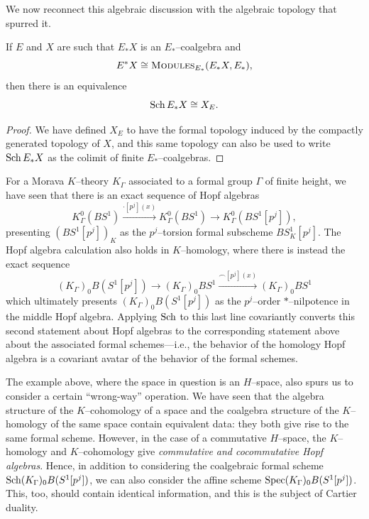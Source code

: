 We now reconnect this algebraic discussion with the algebraic topology that spurred it.

\begin{lemma}
If \(E\) and \(X\) are such that \(E_* X\) is an \(E_*\)--coalgebra and \[E^* X \cong \normalfont\textsc{Modules}_{E_*}(E_* X, E_*),\] then there is an equivalence \[\operatorname{Sch} E_* X \cong X_E.\]
\end{lemma}
\begin{proof}
We have defined \(X_E\) to have the formal topology induced by the compactly generated topology of \(X\), and this same topology can also be used to write \(\operatorname{Sch} E_* X\) as the colimit of finite \(E_*\)--coalgebras.
\end{proof}

\begin{example}\label{KtheoryOfClassifyingSpace}
For a Morava \(K\)--theory \(K_\Gamma\) associated to a formal group \(\Gamma\) of finite height, we have seen that there is an exact sequence of Hopf algebras \[K_\Gamma^0(BS^1) \xrightarrow{\cdot [p^j](x)} K_\Gamma^0(BS^1) \to K_\Gamma^0(BS^1[p^j]),\] presenting \((BS^1[p^j])_K\) as the \(p^j\)--torsion formal subscheme \(BS^1_K[p^j]\).
The Hopf algebra calculation also holds in \(K\)--homology, where there is instead the exact sequence \[(K_\Gamma)_0 B(S^1[p^j]) \to (K_\Gamma)_0 BS^1 \xrightarrow{\frown [p^j](x)} (K_\Gamma)_0 BS^1\] which ultimately presents \((K_\Gamma)_0 B(S^1[p^j])\) as the \(p^j\)--order \(\ast\)--nilpotence in the middle Hopf algebra.
Applying \(\operatorname{Sch}\) to this last line covariantly converts this second statement about Hopf algebras to the corresponding statement above about the associated formal schemes---i.e., the behavior of the homology Hopf algebra is a covariant avatar of the behavior of the formal schemes.
\end{example}

The example above, where the space in question is an \(H\)--space, also spurs us to consider a certain ``wrong-way'' operation.
We have seen that the algebra structure of the \(K\)--cohomology of a space and the coalgebra structure of the \(K\)--homology of the same space contain equivalent data: they both give rise to the same formal scheme.
However, in the case of a commutative \(H\)--space, the \(K\)--homology and \(K\)--cohomology give \emph{commutative and cocommutative Hopf algebras}.
Hence, in addition to considering the coalgebraic formal scheme \(\operatorname{Sch} (K_\Gamma)_0 B(S^1[p^j])\), we can also consider the affine scheme \(\operatorname{Spec} (K_\Gamma)_0 B(S^1[p^j])\).
This, too, should contain identical information, and this is the subject of Cartier duality.

